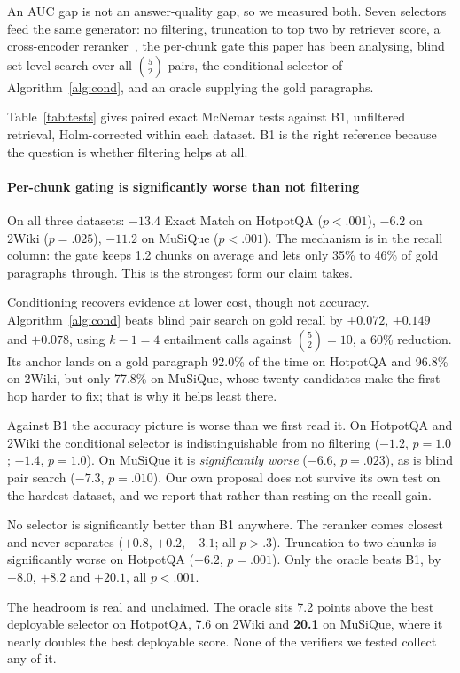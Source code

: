 \documentclass[conference]{IEEEtran}
\begin{document}
An AUC gap is not an answer-quality gap, so we measured both. Seven selectors
feed the same generator: no filtering, truncation to top two by retriever score,
a cross-encoder reranker~\cite{xiao2024bge}, the per-chunk gate this paper has
been analysing, blind set-level search over all $\binom{5}{2}$ pairs, the
conditional selector of Algorithm~\ref{alg:cond}, and an oracle supplying the
gold paragraphs.

Table~\ref{tab:tests} gives paired exact McNemar tests against B1, unfiltered
retrieval, Holm-corrected within each dataset. B1 is the right reference because
the question is whether filtering helps at all.

\paragraph{Per-chunk gating is significantly worse than not filtering}
On all three datasets: $-13.4$ Exact Match on HotpotQA ($p<.001$), $-6.2$ on
2Wiki ($p=.025$), $-11.2$ on MuSiQue ($p<.001$). The mechanism is in the recall
column: the gate keeps 1.2 chunks on average and lets only 35\% to 46\% of gold
paragraphs through. This is the strongest form our claim takes.

Conditioning recovers evidence at lower cost, though not accuracy.
Algorithm~\ref{alg:cond} beats blind pair search on gold recall by $+0.072$,
$+0.149$ and $+0.078$, using $k-1=4$ entailment calls against $\binom{5}{2}=10$,
a 60\% reduction. Its anchor lands on a gold paragraph 92.0\% of the time on
HotpotQA and 96.8\% on 2Wiki, but only 77.8\% on MuSiQue, whose twenty
candidates make the first hop harder to fix; that is why it helps least there.

Against B1 the accuracy picture is worse than we first read it. On HotpotQA and
2Wiki the conditional selector is indistinguishable from no filtering ($-1.2$,
$p=1.0$; $-1.4$, $p=1.0$). On MuSiQue it is \emph{significantly worse}
($-6.6$, $p=.023$), as is blind pair search ($-7.3$, $p=.010$). Our own proposal
does not survive its own test on the hardest dataset, and we report that rather
than resting on the recall gain.

No selector is significantly better than B1 anywhere. The reranker comes closest
and never separates ($+0.8$, $+0.2$, $-3.1$; all $p>.3$). Truncation to two
chunks is significantly worse on HotpotQA ($-6.2$, $p=.001$). Only the oracle
beats B1, by $+8.0$, $+8.2$ and $+20.1$, all $p<.001$.

The headroom is real and unclaimed. The oracle sits 7.2 points above the best
deployable selector on HotpotQA, 7.6 on 2Wiki and \textbf{20.1} on MuSiQue,
where it nearly doubles the best deployable score. None of the verifiers we
tested collect any of it.
\end{document}
